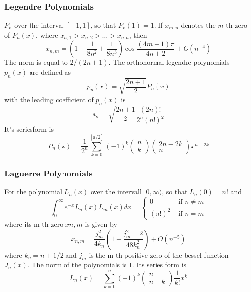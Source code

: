 \documentclass[%
reprint,
amsmath,amssymb,
aps,
]{revtex4-1}
\begin{document}
\subsubsection{Legendre Polynomials}
$P_n$ over the interval $[-1,1]$, so that $P_n(1) = 1$. If $x_{m,n}$ denotes the $m$-th zero of $P_n(x)$, where $x_{n,1} > x_{n,2} > \dots > x_{n,n} $, then 
\begin{equation}
x_{n, m}=\left(1-\frac{1}{8 n^{2}}+\frac{1}{8 n^{3}}\right) \cos \frac{(4 m-1) \pi}{4 n+2}+O\left(n^{-4}\right)
\end{equation}
The norm is equal to $2/(2n+1)$. The orthonormal legendre polynomials $p_n(x)$ are defined as 
\begin{equation}
p_{n}(x)=\sqrt{\frac{2 n+1}{2}} P_{n}(x)
\end{equation}
with the leading coefficient of $p_n(x)$ is 
\begin{equation}
a_{n}=\sqrt{\frac{2 n+1}{2}} \frac{(2 n) !}{2^{n}(n !)^{2}}
\end{equation}
It's seriesform is
 \begin{equation}
 P_{n}(x)=\frac{1}{2^{n}} \sum_{k=0}^{[n / 2]}(-1)^{k}\left(\begin{array}{l}{n} \\ {k}\end{array}\right)\left(\begin{array}{c}{2 n-2 k} \\ {n}\end{array}\right) x^{n-2 k}
 \end{equation}
\subsubsection{Laguerre Polynomials}
For the polynomial $L_n(x)$ over the intervall $[0,\infty)$, so that $L_n(0) = n!$ and
\begin{equation}
\int_{0}^{\infty} e^{-x} L_{n}(x) L_{m}(x) d x=\left\{\begin{array}{ll}{0} & {\text { if } n \neq m} \\ {(n !)^{2}} & {\text { if } n=m}\end{array}\right.
\end{equation}
where its m-th zero $xn,m$ is given by 
\begin{equation}
x_{n, m}=\frac{j_{m}^{2}}{4 k_{n}}\left(1+\frac{j_{m}^{2}-2}{48 k_{n}^{2}}\right)+O\left(n^{-5}\right)
\end{equation}
where $k_n = n + 1/2$ and $j_m$ is the m-th positive zero of the bessel function $J_n(x)$. The norm of the polynomials is 1. 
Its series form is
\begin{equation}
L_{n}(x)=\sum_{k=0}^{n}(-1)^{k}\left(\begin{array}{c}{n} \\ {n-k}\end{array}\right) \frac{1}{k !} x^{k}
\end{equation}
\end{document}
